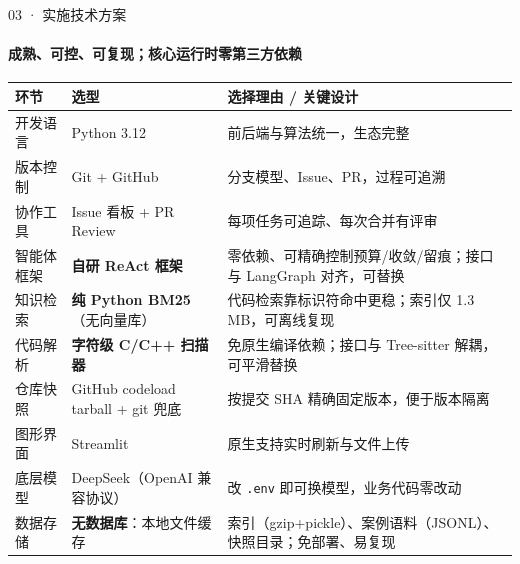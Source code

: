 \documentclass{beamer}
\begin{document}
\begin{frame}{03 · 实施技术方案}
\framesubtitle{成熟、可控、可复现；核心运行时零第三方依赖}
\footnotesize
\begin{tabular}{@{}p{}p{}p{}@{}}
\toprule
\textbf{环节} & \textbf{选型} & \textbf{选择理由 / 关键设计} \\
\midrule
开发语言 & Python 3.12 & 前后端与算法统一，生态完整 \\
版本控制 & Git + GitHub & 分支模型、Issue、PR，过程可追溯 \\
协作工具 & Issue 看板 + PR Review & 每项任务可追踪、每次合并有评审 \\
智能体框架 & \textbf{自研 ReAct 框架} & 零依赖、可精确控制预算/收敛/留痕；接口与 LangGraph 对齐，可替换 \\
知识检索 & \textbf{纯 Python BM25}（无向量库） & 代码检索靠标识符命中更稳；索引仅 1.3 MB，可离线复现 \\
代码解析 & \textbf{字符级 C/C++ 扫描器} & 免原生编译依赖；接口与 Tree-sitter 解耦，可平滑替换 \\
仓库快照 & GitHub codeload tarball + git 兜底 & 按提交 SHA 精确固定版本，便于版本隔离 \\
图形界面 & Streamlit & 原生支持实时刷新与文件上传 \\
底层模型 & DeepSeek（OpenAI 兼容协议） & 改 \texttt{.env} 即可换模型，业务代码零改动 \\
数据存储 & \textbf{无数据库}：本地文件缓存 & 索引（gzip+pickle）、案例语料（JSONL）、快照目录；免部署、易复现 \\
\bottomrule
\end{tabular}
\end{frame}
\end{document}
